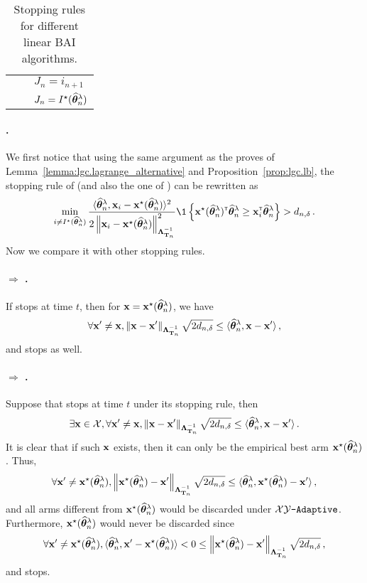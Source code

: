 \begin{table}[ht]
\begin{tabular}{@{}lll@{}}
		\midrule
		\LG & \makecell{$\max_{i\in \cI} \inf_{\btheta'\in\neg i} \dfrac{\normm{\hbtheta_n^\lambda-\btheta'}^2_{\bLambda_{\bT_n}}}{2}\geq d_{n,\delta}$} & $J_n = i_{n+1}$ \\
		\LGC & \makecell{$\max_{i\in \cI} \inf_{\btheta'\in\neg i} \dfrac{\normm{\hbtheta_n^\lambda-\btheta'}^2_{\bLambda_{\bT_n}}}{2}\geq d_{n,\delta}$} & $J_n = I^\star(\widehat{{\boldsymbol \theta}}_n^\lambda)$ \\
		\bottomrule
	\end{tabular}
	\caption{Stopping rules for different linear BAI algorithms.}
	\label{tab:stopping_rules}
\end{table}

\paragraph{\LG{}.}
We first notice that using the same argument as the proves of Lemma~\ref{lemma:lgc.lagrange_alternative} and Proposition~\ref{prop:lgc.lb}, the stopping rule of \LG (and also the one of \GLUCB{}) can be rewritten as
\[
	\min_{i \neq \Istar(\hbtheta_n^\lambda)} \dfrac{\langle\hbtheta_n^\lambda,\bx_i-\bx^\star(\hbtheta_n^\lambda)\rangle^2}{2\normm{\bx_i - \bx^\star(\hbtheta_n^\lambda)}_{{\bLambda_{\bT_n}^{-1}}}^2} \1\left\{\bx^\star(\hbtheta_n^\lambda)^\top\hbtheta_n^\lambda \geq \bx_i^\top\hbtheta_n^\lambda\right\} > d_{n,\delta}\,.
\]
Now we compare it with other stopping rules.

\paragraph{\LG{} $\Rightarrow$ \XYS{}.}
If \LG{} stops at time $t$, then for ${\bf x} = {\bf x}^\star(\widehat{{\boldsymbol \theta}}_n^\lambda)$, we have
\[
    \forall {\bf x}'\neq {\bf x}, \left\lVert{\bf x}-{\bf x}'\right\rVert_{{\boldsymbol \Lambda}_{{\bf T}_n}^{-1}}\sqrt{2d_{n,\delta}}\leq \langle\widehat{{\boldsymbol \theta}}_n^\lambda,{\bf x}-{\bf x}'\rangle\,,
\]
and \XYS{} stops as well.

\paragraph{\XYS{} $\Rightarrow$ \XYA{}.}
Suppose that \XYS{} stops at time $t$ under its stopping rule, then
\[
\exists {\bf x}\in\mathcal{X}, \forall {\bf x}'\neq {\bf x}, \left\lVert{\bf x}-{\bf x}'\right\rVert_{{\boldsymbol \Lambda}_{{\bf T}_n}^{-1}}\sqrt{2d_{n,\delta}}\leq \langle\widehat{{\boldsymbol \theta}}_n^\lambda,{\bf x}-{\bf x}'\rangle\,.
\]
It is clear that if such ${\bf x}$ exists, then it can only be the empirical best arm ${\bf x}^\star(\widehat{{\boldsymbol \theta}}_n^\lambda)$. Thus,
\[
    \forall {\bf x}'\neq {\bf x}^\star(\widehat{{\boldsymbol \theta}}_n^\lambda), \left\lVert{\bf x}^\star(\widehat{{\boldsymbol \theta}}_n^\lambda)-{\bf x}'\right\rVert_{{\boldsymbol \Lambda}_{{\bf T}_n}^{-1}}\sqrt{2d_{n,\delta}}\leq\langle\widehat{{\boldsymbol \theta}}_n^\lambda,{\bf x}^\star(\widehat{{\boldsymbol \theta}}_n^\lambda)-{\bf x}'\rangle\,,
\]
and all arms different from ${\bf x}^\star(\widehat{{\boldsymbol \theta}}_n^\lambda)$ would be discarded under $\texttt{$\mathcal{X}\mathcal{Y}$-Adaptive}$. Furthermore, ${\bf x}^\star(\widehat{{\boldsymbol \theta}}_n^\lambda)$ would never be discarded since
\[
    \forall {\bf x}'\neq {\bf x}^\star(\widehat{{\boldsymbol \theta}}_n^\lambda), \langle\widehat{{\boldsymbol \theta}}_n^\lambda,{\bf x}'-{\bf x}^\star(\widehat{{\boldsymbol \theta}}_n^\lambda)\rangle < 0 \le \left\lVert{\bf x}^\star(\widehat{{\boldsymbol \theta}}_n^\lambda)-{\bf x}'\right\rVert_{{\boldsymbol \Lambda}_{{\bf T}_n}^{-1}}\sqrt{2d_{n,\delta}}\,,
\]
and \XYA{} stops.

